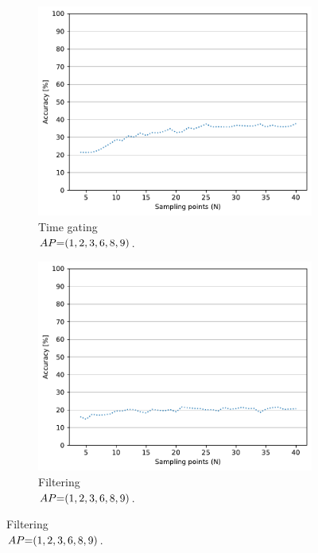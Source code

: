 \begin{figure}[ht]
  \begin{subfigure}{.49\textwidth}
    \centering
    \includegraphics[width=.99\linewidth]{Figures/RadarExperiments/Datasets/ThroughMaterials/Wood+Glass/samples-timegating-ud.pdf}
    \vspace{-5pt}
    \captionsetup{width=.99\linewidth}
    \caption{Time gating \\ $\splitatcommas{AP{=}(1, 2, 3, 6, 8, 9)}$.}
    \label{fig:radar-experiments:through-materials:wood-glass-samples:timegating-ud}
  \end{subfigure}
  \begin{subfigure}{.49\textwidth}
    \centering
    \includegraphics[width=.99\linewidth]{Figures/RadarExperiments/Datasets/ThroughMaterials/Wood+Glass/samples-filtering-ud.pdf}  
    \vspace{-5pt}
    \captionsetup{width=.99\linewidth}
    \caption{Filtering \\ $\splitatcommas{AP{=}(1, 2, 3, 6, 8, 9)}$.}
    \label{fig:radar-experiments:through-materials:wood-glass-samples:filtering-ud}
  \end{subfigure}


\end{figure}
